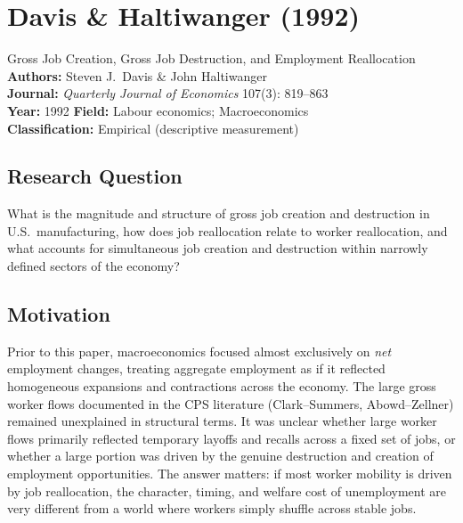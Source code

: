 \chapter{Davis \& Haltiwanger (1992)}

\begin{paperbox}{Gross Job Creation, Gross Job Destruction, and Employment Reallocation}
\textbf{Authors:} Steven J.\ Davis \& John Haltiwanger\\[3pt]
\textbf{Journal:} \textit{Quarterly Journal of Economics} 107(3): 819--863\\[3pt]
\textbf{Year:} 1992 \quad\textbf{Field:} Labour economics; Macroeconomics\\[3pt]
\textbf{Classification:} Empirical (descriptive measurement)
\end{paperbox}

\section{Research Question}

What is the magnitude and structure of gross job creation and destruction in
U.S.\ manufacturing, how does job reallocation relate to worker reallocation,
and what accounts for simultaneous job creation and destruction within
narrowly defined sectors of the economy?

\section{Motivation}

Prior to this paper, macroeconomics focused almost exclusively on \emph{net}
employment changes, treating aggregate employment as if it reflected
homogeneous expansions and contractions across the economy. The large gross
worker flows documented in the CPS literature (Clark--Summers, Abowd--Zellner)
remained unexplained in structural terms. It was unclear whether large worker
flows primarily reflected temporary layoffs and recalls across a fixed set of
jobs, or whether a large portion was driven by the genuine destruction and
creation of employment opportunities. The answer matters: if most worker
mobility is driven by job reallocation, the character, timing, and welfare cost
of unemployment are very different from a world where workers simply shuffle
across stable jobs.

